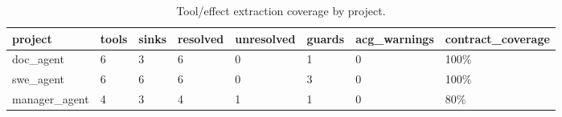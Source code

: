 \begin{table}[t]
\centering
\begin{tabular}{llllllll}
\toprule
project & tools & sinks & resolved & unresolved & guards & acg\_warnings & contract\_coverage \\
\midrule
doc\_agent & 6 & 3 & 6 & 0 & 1 & 0 & 100\% \\
swe\_agent & 6 & 6 & 6 & 0 & 3 & 0 & 100\% \\
manager\_agent & 4 & 3 & 4 & 1 & 1 & 0 & 80\% \\
\bottomrule
\end{tabular}
\caption{Tool/effect extraction coverage by project.}
\label{tab:coverage}
\end{table}